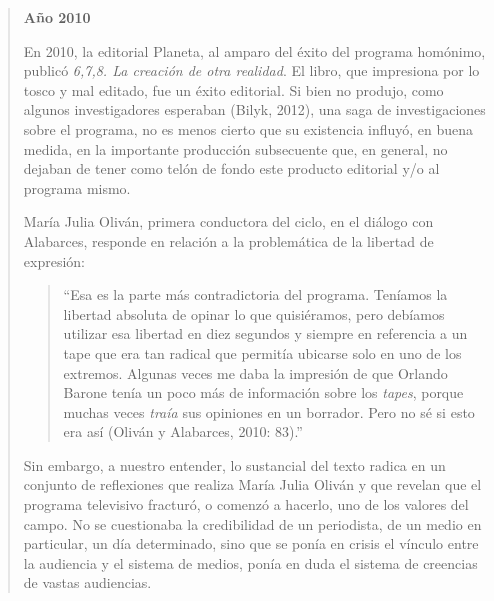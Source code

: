 \begin{quote}
\textbf{Año 2010}

En 2010, la editorial Planeta, al amparo del éxito del programa homónimo, publicó \emph{6,7,8. La creación de otra realidad}. El libro, que impresiona por lo tosco y mal editado, fue un éxito editorial. Si bien no produjo, como algunos investigadores esperaban (Bilyk, 2012), una saga de investigaciones sobre el programa, no es menos cierto que su existencia influyó, en buena medida, en la importante producción subsecuente que, en general, no dejaban de tener como telón de fondo este producto editorial y/o al programa mismo.

María Julia Oliván, primera conductora del ciclo, en el diálogo con Alabarces, responde en relación a la problemática de la libertad de expresión:

\begin{quote}
	\enquote{Esa es la parte más contradictoria del programa. Teníamos la libertad absoluta de opinar lo que quisiéramos, pero debíamos utilizar esa libertad en diez segundos y siempre en referencia a un tape que era tan radical que permitía ubicarse solo en uno de los extremos. Algunas veces me daba la impresión de que Orlando Barone tenía un poco más de información sobre los \emph{tapes}, porque muchas veces \emph{traía} sus opiniones en un borrador. Pero no sé si esto era así (Oliván y Alabarces, 2010: 83).}
\end{quote}


Sin embargo, a nuestro entender, lo sustancial del texto radica en un conjunto de reflexiones que realiza María Julia Oliván y que revelan que el programa televisivo fracturó, o comenzó a hacerlo, uno de los valores del campo. No se cuestionaba la credibilidad de un periodista, de un medio en particular, un día determinado, sino que se ponía en crisis el vínculo entre la audiencia y el sistema de medios, ponía en duda el sistema de creencias de vastas audiencias.


\end{quote}
